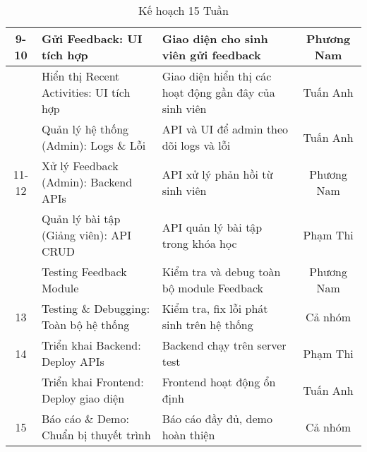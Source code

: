 \begin{table}[H]
\begin{tabular}{|c|p{4.5cm}|p{6.5cm}|c|}
    9-10 & Gửi Feedback: UI tích hợp & Giao diện cho sinh viên gửi feedback & Phương Nam \\ \hline
        & Hiển thị Recent Activities: UI tích hợp & Giao diện hiển thị các hoạt động gần đây của sinh viên & Tuấn Anh \\ \hline
        & Quản lý hệ thống (Admin): Logs \& Lỗi & API và UI để admin theo dõi logs và lỗi & Tuấn Anh \\ \hline
    11-12 & Xử lý Feedback (Admin): Backend APIs & API xử lý phản hồi từ sinh viên & Phương Nam \\ \hline
        & Quản lý bài tập (Giảng viên): API CRUD & API quản lý bài tập trong khóa học & Phạm Thi \\ \hline
        & Testing Feedback Module & Kiểm tra và debug toàn bộ module Feedback & Phương Nam \\ \hline
    13 & Testing \& Debugging: Toàn bộ hệ thống & Kiểm tra, fix lỗi phát sinh trên hệ thống & Cả nhóm \\ \hline
    14 & Triển khai Backend: Deploy APIs & Backend chạy trên server test & Phạm Thi \\ \hline
        & Triển khai Frontend: Deploy giao diện & Frontend hoạt động ổn định & Tuấn Anh \\ \hline
    15 & Báo cáo \& Demo: Chuẩn bị thuyết trình & Báo cáo đầy đủ, demo hoàn thiện & Cả nhóm \\ \hline
    \end{tabular}
    \caption{Kế hoạch 15 Tuần}
\end{table}